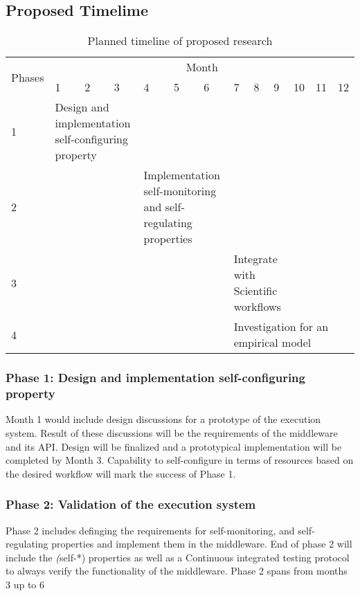 
\subsection{Proposed Timelime}
\begin{table*}[ht]
	\centering
	\begin{tabular}{|p{1.1cm}|p{0.75cm}p{0.75cm}p{0.75cm}p{0.75cm}p{0.75cm}p{0.75cm}p{0.75cm}p{0.75cm}p{0.75cm}p{0.75cm}p{0.75cm}p{0.75cm}|}
		\hline
		\multirow{2}{*}{Phases} & \multicolumn{12}{|c|}{Month}\\
		   & 1 & 2 & 3 & 4 & 5 & 6 & 7 & 8 & 9 & 10 & 11 & 12\\\hline\hline
		 1 & \multicolumn{3}{p{2.25cm}}{Design and implementation self-configuring property}&   &   &   &   &   &   &    &    &   \\\hline
		 2 &   &   &   & \multicolumn{3}{p{2.25cm}}{Implementation self-monitoring and self-regulating properties} &   &   &   &    &    &   \\\hline
		 3 &   &   &   &   &   &   &\multicolumn{3}{p{2.25cm}}{Integrate with Scientific workflows}&    &    &   \\\hline
		 4 &   &   &   &   &   &   &\multicolumn{6}{p{4.5cm}|}{Investigation for an empirical model} \\\hline
	\end{tabular}
\caption{Planned timeline of proposed research}\label{tab:work_plan}
\end{table*}

\subsubsection{Phase 1: Design and implementation self-configuring property}

Month 1 would include design discussions for a prototype of the execution system. 
Result of these discussions will be the requirements of the middleware and its 
API. Design will be finalized and a prototypical implementation will be completed 
by Month 3. Capability to self-configure in terms of resources based on the desired 
workflow will mark the success of Phase 1.

\subsubsection{Phase 2: Validation of the execution system}
Phase 2 includes definging the requirements for self-monitoring, and self-regulating 
properties and implement them in the middleware. End of phase 2 will include the 
\textit(self-*) properties as well as a Continuous integrated testing protocol to 
always verify the functionality of the middleware. Phase 2 spans from months 3 up 
to 6

